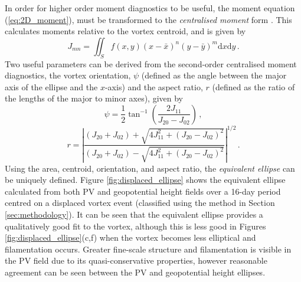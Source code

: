 In order for higher order moment diagnostics to be useful, the moment equation
(\ref{eq:2D_moment}), must be transformed to the \emph{centralised moment}
form \citep{Hall2005}. This calculates moments relative to the vortex centroid,
and is given by
\begin{equation}
J_{mn} = \iint_{S} f(x,y)(x-\bar{x})^n(y-\bar{y})^m\mathrm{d}x\mathrm{d}y \, .
\end{equation}
Two useful parameters can be derived from the second-order centralised moment
diagnostics, the vortex orientation, $\psi$ (defined as the angle between the
major axis of the ellipse and the $x$-axis) and the aspect ratio, $r$ (defined
as the ratio of the lengths of the major to minor axes), given by
\begin{equation}
\psi = \frac{1}{2} \tan^{-1} \left( \frac{2J_{11}}{J_{20}-J_{02}} \right) \, ,
\end{equation}
\begin{equation}
r = \left| \frac{(J_{20}+J_{02})+\sqrt{4J_{11}^2+(J_{20}-J_{02})^2}}
  {(J_{20}+J_{02})-\sqrt{4J_{11}^2+(J_{20}-J_{02})^2}} \right|^{1/2} \, .
\end{equation}
Using the area, centroid, orientation, and aspect ratio, the \emph{equivalent
  ellipse} can be uniquely defined. Figure \ref{fig:displaced_ellipse} shows the
equivalent ellipse calculated from both PV and geopotential height fields over a
16-day period centred on a displaced vortex event (classified using the method
in Section \ref{sec:methodology}). It can be seen that the equivalent ellipse
provides a qualitatively good fit to the vortex, although this is less good in
Figures \ref{fig:displaced_ellipse}(c,f) when the vortex becomes less elliptical
and filamentation occurs. Greater fine-scale structure and filamentation is
visible in the PV field due to its quasi-conservative properties, however
reasonable agreement can be seen between the PV and geopotential height
ellipses. 

